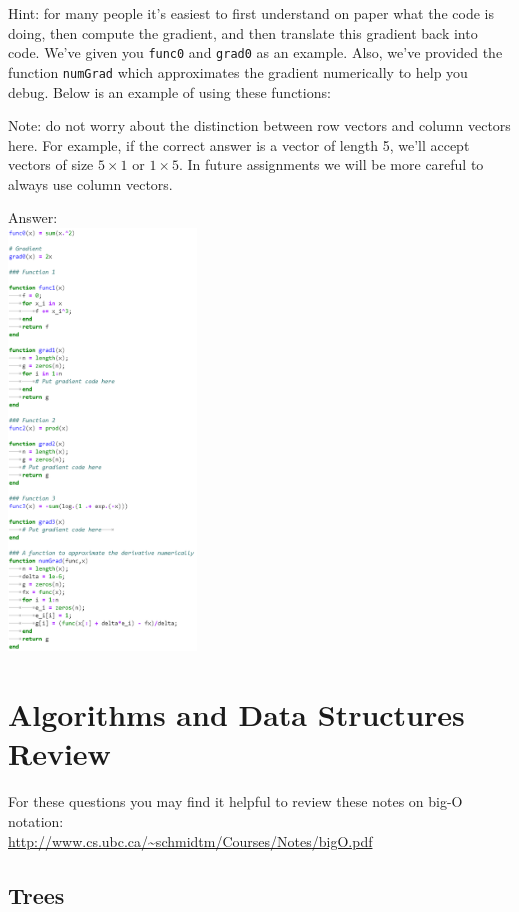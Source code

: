 \documentclass{article}
\def\ans#1{\par\gre{Answer: #1}}
\def\gre#1{{\color{gre}#1}}
\begin{document}
Hint: for many people it's easiest to first understand on paper what the code is doing, then compute
the gradient, and then translate this gradient back into code. We've given you \texttt{func0} and \texttt{grad0} as an example. Also, we've provided the function \texttt{numGrad} which approximates the gradient numerically to help you debug. Below is an example of using these functions:

Note: do not worry about the distinction between row vectors and column vectors here.
For example, if the correct answer is a vector of length 5, we'll accept vectors of size $5 \times 1$ or $1 \times 5$. In future assignments we will be more careful to always use column vectors.
\\
\ans{\\
\includegraphics[width = 5cm]{DirivativeOfCode2.png}
}

\section{Algorithms and Data Structures Review}

For these questions you may find it helpful to review these notes on big-O notation:\\
\url{http://www.cs.ubc.ca/~schmidtm/Courses/Notes/bigO.pdf}

\subsection{Trees}
\end{document}
